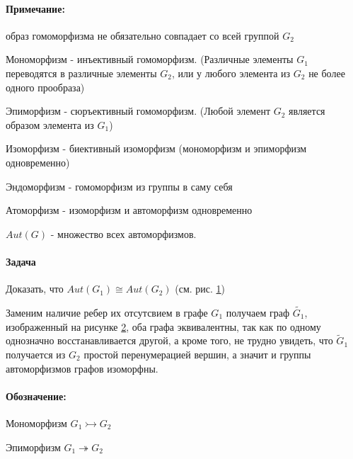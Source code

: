 \paragraph{Примечание:} образ гомоморфизма не обязательно совпадает со всей группой $G_2$

\begin{Def}
	Мономорфизм - инъективный гомоморфизм. (Различные элементы $G_1$ переводятся в различные элементы $G_2$, или у любого элемента из $G_2$ не более одного прообраза)
\end{Def}

\begin{Def}
	Эпиморфизм - сюръективный гомоморфизм. (Любой элемент $G_2$ является образом элемента из $G_1$)
\end{Def}

\begin{Def}
	Изоморфизм - биективный изоморфизм (мономорфизм и эпиморфизм одновременно)
\end{Def}

\begin{Def}
	Эндоморфизм - гомоморфизм из группы в саму себя
\end{Def}

\begin{Def}
	Атоморфизм - изоморфизм и автоморфизм одновременно
\end{Def}

\begin{Def}
	$Aut(G)$ - множество всех автоморфизмов.
\end{Def}

\begin{figure}[h]
	\begin{minipage}[h]{0.4\linewidth}
		\noindent{}
	\end{minipage}
	\hfill
	\begin{minipage}[h]{0.4\linewidth}
		\noindent{}	\end{minipage}
	\label{pic::graphs}
\end{figure}

\paragraph{Задача} Доказать, что $Aut(G_1) \cong Aut(G_2)$ (см. рис. \ref{pic::graphs})

\begin{Solution}
\begin{figure}[h]
	\noindent{}
	\label{pic::tilde_graph}
\end{figure}

	Заменим наличие ребер их отсутсвием в графе $G_1$ получаем граф $\tilde {G_1}$, изображенный на рисунке \ref{pic::tilde_graph}, оба графа эквивалентны, так как по одному однозначно восстанавливается другой, а кроме того, не трудно увидеть, что $\tilde G_1$ получается из $G_2$ простой перенумерацией вершин, а значит и группы автоморфизмов графов изоморфны.
\end{Solution}

\paragraph{Обозначение:}
Мономорфизм $G_1 \rightarrowtail G_2$

Эпиморфизм $G_1 \twoheadrightarrow G_2$

